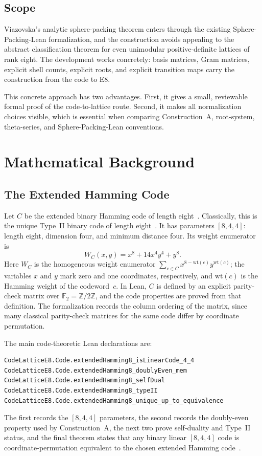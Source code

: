 \documentclass[12pt]{article}
\theoremstyle{definition}
\newcommand{\Z}{\mathbb{Z}}
\newcommand{\F}{\mathbb{F}}
\begin{document}
\subsection{Scope}

Viazovska's analytic sphere-packing theorem enters through the existing
Sphere-Packing-Lean formalization, and the construction avoids appealing to the
abstract classification theorem for even unimodular positive-definite lattices
of rank eight.  The development works concretely: basis matrices, Gram
matrices, explicit shell counts, explicit roots, and explicit transition maps
carry the construction from the code to E8.

This concrete approach has two advantages.  First, it gives a small,
reviewable formal proof of the code-to-lattice route.  Second, it makes all
normalization choices visible, which is essential when comparing Construction~A,
root-system, theta-series, and Sphere-Packing-Lean conventions.

\section{Mathematical Background}
\label{sec:background}

\subsection{The Extended Hamming Code}

Let $C$ be the extended binary Hamming code of length eight~\cite{Hamming1950}.
Classically, this is the unique Type~II binary code of length
eight~\cite{MacSloane1977,ConwaySloane1999}.  It has parameters $[8,4,4]$:
length eight, dimension four, and minimum distance four.  Its weight enumerator
is~\cite{MacSloane1977}
\[
  W_C(x,y) = x^8 + 14x^4y^4 + y^8.
\]
Here \(W_C\) is the homogeneous weight enumerator
\(\sum_{c\in C} x^{8-\mathrm{wt}(c)}y^{\mathrm{wt}(c)}\); the variables \(x\)
and \(y\) mark zero and one coordinates, respectively, and
\(\mathrm{wt}(c)\) is the Hamming weight of the codeword~\(c\).
In Lean, $C$ is defined by an explicit
parity-check matrix over $\F_2 = \Z/2\Z$, and the code properties are proved
from that definition.  The formalization records the column ordering of the
matrix, since many classical parity-check matrices for the same code differ by
coordinate permutation.

The main code-theoretic Lean declarations are:
\begin{lstlisting}[style=lean]
CodeLatticeE8.Code.extendedHamming8_isLinearCode_4_4
CodeLatticeE8.Code.extendedHamming8_doublyEven_mem
CodeLatticeE8.Code.extendedHamming8_selfDual
CodeLatticeE8.Code.extendedHamming8_typeII
CodeLatticeE8.Code.extendedHamming8_unique_up_to_equivalence
\end{lstlisting}
The first records the $[8,4,4]$ parameters, the second records the doubly-even
property used by Construction~A, the next two prove self-duality and Type~II
status, and the final theorem states that any binary linear $[8,4,4]$ code is
coordinate-permutation equivalent to the chosen extended Hamming
code~\cite{MacSloane1977,HuffmanPless2003}.
\end{document}
